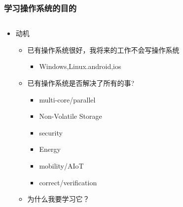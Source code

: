\documentclass[UTF8]{ctexbeamer}
\begin{document}
\begin{frame}
    \frametitle{学习操作系统的目的}
    \begin{columns}[t]
    \begin{column}{0.5\textwidth}
    \begin{itemize}
    \item 动机
    \begin{itemize}
    \item 已有操作系统很好，我将来的工作不会写操作系统
    \begin{itemize}
        \item Windows,Linux.android,ios
    \end{itemize}
    \item 已有操作系统是否解决了所有的事?
        \begin{itemize}
        \item multi-core/parallel
        \item Non-Volatile Storage
        \item security
        \item Energy
        \item mobility/AIoT
        \item correct/verification
    \end{itemize}
    \item 为什么我要学习它？
        \end{itemize}
    \end{itemize}
     \end{column}

     
    \begin{column}{0.5\textwidth}
    
    \end{column}
    
    \end{columns}
    
    \end{frame}
\end{document}
